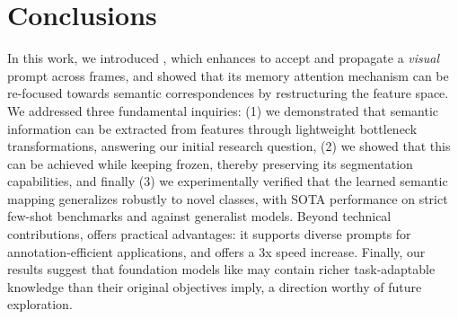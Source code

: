 \section{Conclusions}

In this work, we introduced \ours{}, which enhances \sam{} to accept and propagate a \textit{visual} prompt across frames, and showed that its memory attention mechanism can be re-focused towards semantic correspondences by restructuring the feature space. We addressed three fundamental inquiries: (1) we demonstrated that semantic information can be extracted from \sam{} features through lightweight bottleneck transformations, answering our initial research question,  (2) we showed that this can be achieved while keeping \sam{} frozen, thereby preserving its segmentation capabilities, and finally (3) we experimentally verified that the learned semantic mapping generalizes robustly to novel classes, with SOTA performance on strict few-shot benchmarks and against generalist models. Beyond technical contributions, \ours{} offers practical advantages: it supports diverse prompts for annotation-efficient applications, and offers a 3x speed increase. Finally, our results suggest that foundation models like \sam{} may contain richer task-adaptable knowledge than their original objectives imply, a direction worthy of future exploration.


\newpage
